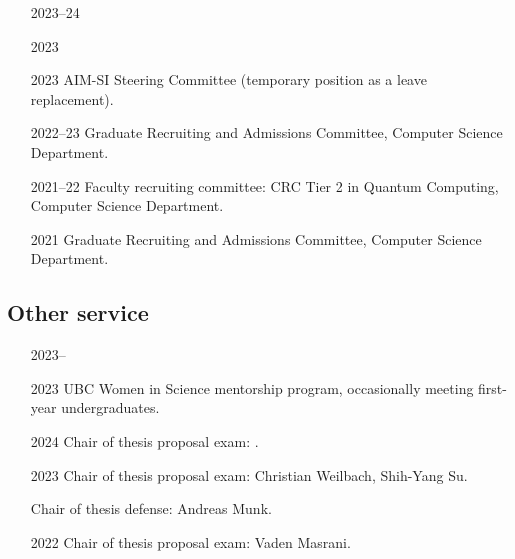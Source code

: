 \documentclass[10pt]{article}
\begin{document}
\begin{itemize}[leftmargin=5em]
  \item[2023--24] 
  \item[2023] 
  \item[2023] AIM-SI Steering Committee (temporary position as a leave replacement).
  \item[2022--23] Graduate Recruiting and Admissions Committee, Computer Science Department.
  \item[2021--22] Faculty recruiting committee: CRC Tier 2 in Quantum Computing, Computer Science Department.
  \item[2021] Graduate Recruiting and Admissions Committee, Computer Science Department.
\end{itemize}

\subsection{Other service} %

\begin{itemize}[leftmargin=5em]
  \item[2023--] 
  \item[2023] {UBC Women in Science mentorship program}, occasionally meeting first-year undergraduates.
  \item[2024] Chair of thesis proposal exam: .
  \item[2023] Chair of thesis proposal exam: Christian Weilbach, Shih-Yang Su.
  \item[] Chair of thesis defense: Andreas Munk.
  \item[2022] Chair of thesis proposal exam: Vaden Masrani.
\end{itemize}



\end{document}
